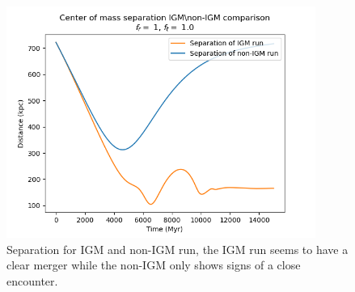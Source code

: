 \documentclass[a4paper,12pt, english]{article}
\begin{document}
\begin{figure}[!htb]
    \centering
    \includegraphics[width=0.9\textwidth]{separation/_separation_IGM_comparison_tvel10.png}
    \caption{Separation for IGM and non-IGM run, the IGM run seems to have a clear merger while the non-IGM only shows signs of a close encounter.}
    \label{fig:sep-comparison}
\end{figure}
\newpage
\end{document}
